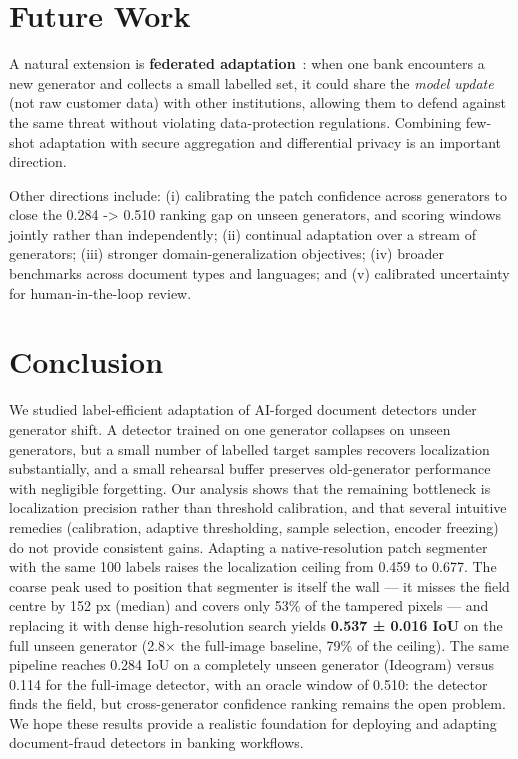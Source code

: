\documentclass[preprint,12pt]{elsarticle}
\begin{document}
\bigskip

\section{Future Work}\label{future-work}

A natural extension is \textbf{federated adaptation}~\cite{mcmahan2017fedavg}: when one bank encounters a new generator and collects a small labelled set, it could share the \emph{model update} (not raw customer data) with other institutions, allowing them to defend against the same threat without violating data-protection regulations. Combining few-shot adaptation with secure aggregation and differential privacy is an important direction.

Other directions include: (i) calibrating the patch confidence across generators to close the 0.284 -\textgreater{} 0.510 ranking gap on unseen generators, and scoring windows jointly rather than independently; (ii) continual adaptation over a stream of generators; (iii) stronger domain-generalization objectives; (iv) broader benchmarks across document types and languages; and (v) calibrated uncertainty for human-in-the-loop review.

\bigskip

\section{Conclusion}\label{conclusion}

We studied label-efficient adaptation of AI-forged document detectors under generator shift. A detector trained on one generator collapses on unseen generators, but a small number of labelled target samples recovers localization substantially, and a small rehearsal buffer preserves old-generator performance with negligible forgetting. Our analysis shows that the remaining bottleneck is localization precision rather than threshold calibration, and that several intuitive remedies (calibration, adaptive thresholding, sample selection, encoder freezing) do not provide consistent gains. Adapting a native-resolution patch segmenter with the same 100 labels raises the localization ceiling from 0.459 to 0.677. The coarse peak used to position that segmenter is itself the wall --- it misses the field centre by 152 px (median) and covers only 53\% of the tampered pixels --- and replacing it with dense high-resolution search yields \textbf{0.537 ± 0.016 IoU} on the full unseen generator (2.8× the full-image baseline, 79\% of the ceiling). The same pipeline reaches 0.284 IoU on a completely unseen generator (Ideogram) versus 0.114 for the full-image detector, with an oracle window of 0.510: the detector finds the field, but cross-generator confidence ranking remains the open problem. We hope these results provide a realistic foundation for deploying and adapting document-fraud detectors in banking workflows.

\bigskip



\end{document}
